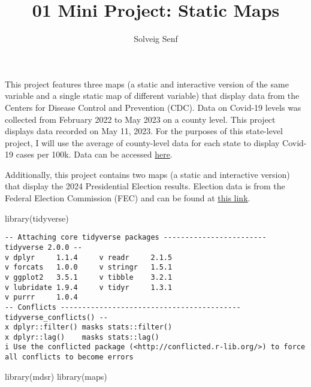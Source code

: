 \documentclass[
  letterpaper,
  DIV=11,
  numbers=noendperiod]{scrartcl}
\title{01 Mini Project: Static Maps}
\author{Solveig Senf}
\date{}
\newenvironment{Shaded}{\begin{snugshade}}{\end{snugshade}}
\newcommand{\FunctionTok}[1]{\textcolor[rgb]{0.28,0.35,0.67}{#1}}
\newcommand{\NormalTok}[1]{\textcolor[rgb]{0.00,0.23,0.31}{#1}}
\begin{document}
\maketitle


This project features three maps (a static and interactive version of
the same variable and a single static map of different variable) that
display data from the Centers for Disease Control and Prevention (CDC).
Data on Covid-19 levels was collected from February 2022 to May 2023 on
a county level. This project displays data recorded on May 11, 2023. For
the purposes of this state-level project, I will use the average of
county-level data for each state to display Covid-19 cases per 100k.
Data can be accessed
\href{https://data.cdc.gov/Public-Health-Surveillance/United-States-COVID-19-Community-Levels-by-County/3nnm-4jni/about_data}{here}.

Additionally, this project contains two maps (a static and interactive
version) that display the 2024 Presidential Election results. Election
data is from the Federal Election Commission (FEC) and can be found at
\href{https://www.fec.gov/introduction-campaign-finance/election-results-and-voting-information/}{this
link}.

\begin{Shaded}
\begin{Highlighting}[]
\FunctionTok{library}\NormalTok{(tidyverse)}
\end{Highlighting}
\end{Shaded}

\begin{verbatim}
-- Attaching core tidyverse packages ------------------------ tidyverse 2.0.0 --
v dplyr     1.1.4     v readr     2.1.5
v forcats   1.0.0     v stringr   1.5.1
v ggplot2   3.5.1     v tibble    3.2.1
v lubridate 1.9.4     v tidyr     1.3.1
v purrr     1.0.4     
-- Conflicts ------------------------------------------ tidyverse_conflicts() --
x dplyr::filter() masks stats::filter()
x dplyr::lag()    masks stats::lag()
i Use the conflicted package (<http://conflicted.r-lib.org/>) to force all conflicts to become errors
\end{verbatim}

\begin{Shaded}
\begin{Highlighting}[]
\FunctionTok{library}\NormalTok{(mdsr)}
\FunctionTok{library}\NormalTok{(maps)}
\end{Highlighting}
\end{Shaded}
\end{document}
